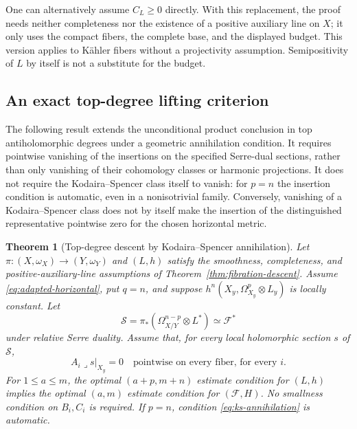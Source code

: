 \documentclass[11pt,reqno]{amsart}
\numberwithin{equation}{section}
\newtheorem{theorem}{Theorem}[section]
\theoremstyle{definition}
\theoremstyle{remark}
\newcommand{\cF}{\mathcal F}
\begin{document}
One can alternatively assume $C_L\geq0$ directly. With this replacement, the proof needs neither completeness nor the existence of a positive auxiliary line on $X$; it only uses the compact fibers, the complete base, and the displayed budget. This version applies to K\"ahler fibers without a projectivity assumption. Semipositivity of $L$ by itself is not a substitute for the budget.

\subsection{An exact top-degree lifting criterion}
The following result extends the unconditional product conclusion in top antiholomorphic degrees under a geometric annihilation condition. It requires pointwise vanishing of the insertions on the specified Serre-dual sections, rather than only vanishing of their cohomology classes or harmonic projections. It does not require the Kodaira--Spencer class itself to vanish: for $p=n$ the insertion condition is automatic, even in a nonisotrivial family. Conversely, vanishing of a Kodaira--Spencer class does not by itself make the insertion of the distinguished representative pointwise zero for the chosen horizontal metric.

\begin{theorem}[Top-degree descent by Kodaira--Spencer annihilation]\label{thm:ks-descent}
Let $\pi:(X,\omega_X)\to(Y,\omega_Y)$ and $(L,h)$ satisfy the smoothness, completeness, and positive-auxiliary-line assumptions of Theorem~\ref{thm:fibration-descent}. Assume \eqref{eq:adapted-horizontal}, put $q=n$, and suppose $h^n(X_y,\Omega^p_{X_y}\otimes L_y)$ is locally constant. Let
\[
 \mathcal S=\pi_*(\Omega^{n-p}_{X/Y}\otimes L^*)
                  \simeq\cF^*
\]
under relative Serre duality. Assume that, for every local holomorphic section $s$ of $\mathcal S$,
\begin{equation}\label{eq:ks-annihilation}
        A_i\lrcorner s|_{X_y}=0
        \quad\text{pointwise on every fiber, for every }i.
\end{equation}
For $1\leq a\leq m$, the optimal $(a+p,m+n)$ estimate condition for $(L,h)$ implies the optimal $(a,m)$ estimate condition for $(\cF,H)$. No smallness condition on $B_i,C_i$ is required. If $p=n$, condition \eqref{eq:ks-annihilation} is automatic.
\end{theorem}
\end{document}
